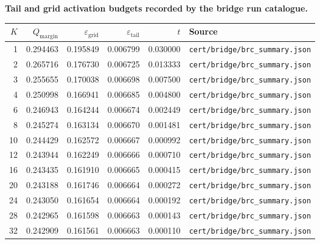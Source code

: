 \begin{center}
  \small\textbf{Tail and grid activation budgets recorded by the bridge run catalogue.}
\end{center}
\begin{center}
  \small
  \begin{tabular}{rrrrrl}
    \toprule
    $K$ & $Q_{\mathrm{margin}}$ & $\varepsilon_{\mathrm{grid}}$ & $\varepsilon_{\mathrm{tail}}$ & $t$ & Source \\
    \midrule
    1 & 0.294463 & 0.195849 & 0.006799 & 0.030000 & \texttt{cert/bridge/brc\_summary.json} \\
    2 & 0.265716 & 0.176730 & 0.006725 & 0.013333 & \texttt{cert/bridge/brc\_summary.json} \\
    3 & 0.255655 & 0.170038 & 0.006698 & 0.007500 & \texttt{cert/bridge/brc\_summary.json} \\
    4 & 0.250998 & 0.166941 & 0.006685 & 0.004800 & \texttt{cert/bridge/brc\_summary.json} \\
    6 & 0.246943 & 0.164244 & 0.006674 & 0.002449 & \texttt{cert/bridge/brc\_summary.json} \\
    8 & 0.245274 & 0.163134 & 0.006670 & 0.001481 & \texttt{cert/bridge/brc\_summary.json} \\
    10 & 0.244429 & 0.162572 & 0.006667 & 0.000992 & \texttt{cert/bridge/brc\_summary.json} \\
    12 & 0.243944 & 0.162249 & 0.006666 & 0.000710 & \texttt{cert/bridge/brc\_summary.json} \\
    16 & 0.243435 & 0.161910 & 0.006665 & 0.000415 & \texttt{cert/bridge/brc\_summary.json} \\
    20 & 0.243188 & 0.161746 & 0.006664 & 0.000272 & \texttt{cert/bridge/brc\_summary.json} \\
    24 & 0.243050 & 0.161654 & 0.006664 & 0.000192 & \texttt{cert/bridge/brc\_summary.json} \\
    28 & 0.242965 & 0.161598 & 0.006663 & 0.000143 & \texttt{cert/bridge/brc\_summary.json} \\
    32 & 0.242909 & 0.161561 & 0.006663 & 0.000110 & \texttt{cert/bridge/brc\_summary.json} \\
    \bottomrule
  \end{tabular}
\end{center}
\par\smallskip
